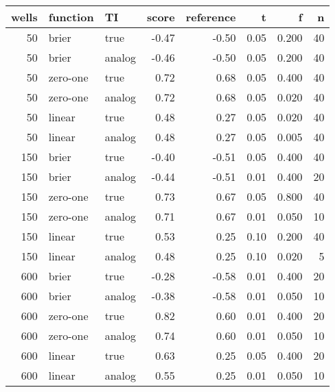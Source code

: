\begin{tabular}{rllrrrrr}
\toprule
 wells &  function &      TI &  score &  reference &     t &      f &   n \\
\midrule
    50 &     brier &    true &  -0.47 &      -0.50 &  0.05 &  0.200 &  40 \\
    50 &     brier &  analog &  -0.46 &      -0.50 &  0.05 &  0.200 &  40 \\
    50 &  zero-one &    true &   0.72 &       0.68 &  0.05 &  0.400 &  40 \\
    50 &  zero-one &  analog &   0.72 &       0.68 &  0.05 &  0.020 &  40 \\
    50 &    linear &    true &   0.48 &       0.27 &  0.05 &  0.020 &  40 \\
    50 &    linear &  analog &   0.48 &       0.27 &  0.05 &  0.005 &  40 \\
   150 &     brier &    true &  -0.40 &      -0.51 &  0.05 &  0.400 &  40 \\
   150 &     brier &  analog &  -0.44 &      -0.51 &  0.01 &  0.400 &  20 \\
   150 &  zero-one &    true &   0.73 &       0.67 &  0.05 &  0.800 &  40 \\
   150 &  zero-one &  analog &   0.71 &       0.67 &  0.01 &  0.050 &  10 \\
   150 &    linear &    true &   0.53 &       0.25 &  0.10 &  0.200 &  40 \\
   150 &    linear &  analog &   0.48 &       0.25 &  0.10 &  0.020 &   5 \\
   600 &     brier &    true &  -0.28 &      -0.58 &  0.01 &  0.400 &  20 \\
   600 &     brier &  analog &  -0.38 &      -0.58 &  0.01 &  0.050 &  10 \\
   600 &  zero-one &    true &   0.82 &       0.60 &  0.01 &  0.400 &  20 \\
   600 &  zero-one &  analog &   0.74 &       0.60 &  0.01 &  0.050 &  10 \\
   600 &    linear &    true &   0.63 &       0.25 &  0.05 &  0.400 &  20 \\
   600 &    linear &  analog &   0.55 &       0.25 &  0.01 &  0.050 &  10 \\
\bottomrule
\end{tabular}

